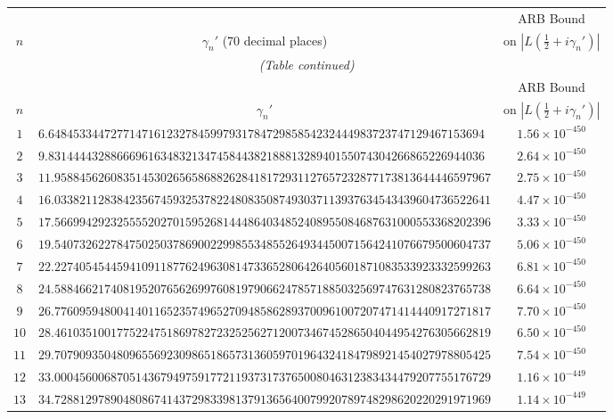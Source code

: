 \documentclass[12pt,reqno]{amsart}
\theoremstyle{remark}
\begin{document}
\renewcommand{\arraystretch}{1.1}
\setlength{\LTleft}{\fill}
\setlength{\LTright}{\fill}
\footnotesize
\begin{longtable}{clc}
\toprule
 & & ARB Bound \\
$n$ & \multicolumn{1}{c}{$\gamma_n'$ (70 decimal places)} & on $|L(\tfrac{1}{2}+i\gamma_n')|$ \\
\midrule
\endfirsthead
\multicolumn{3}{c}{\small\itshape (Table continued)} \\
\toprule
 & & ARB Bound \\
$n$ & \multicolumn{1}{c}{$\gamma_n'$} & on $|L(\tfrac{1}{2}+i\gamma_n')|$ \\
\midrule
\endhead
\bottomrule
\endlastfoot
$1$ & $6.6484533447277147161232784599793178472985854232444983723747129467153694$ & $1.56\times 10^{-450}$ \\
$2$ & $9.8314444328866696163483213474584438218881328940155074304266865226944036$ & $2.64\times 10^{-450}$ \\
$3$ & $11.9588456260835145302656586882628418172931127657232877173813644446597967$ & $2.75\times 10^{-450}$ \\
$4$ & $16.0338211283842356745932537822480835087493037113937634543439604736522641$ & $4.47\times 10^{-450}$ \\
$5$ & $17.5669942923255552027015952681444864034852408955084687631000553368202396$ & $3.33\times 10^{-450}$ \\
$6$ & $19.5407326227847502503786900229985534855264934450071564241076679500604737$ & $5.06\times 10^{-450}$ \\
$7$ & $22.2274054544594109118776249630814733652806426405601871083533923332599263$ & $6.81\times 10^{-450}$ \\
$8$ & $24.5884662174081952076562699760819790662478571885032569747631280823765738$ & $6.64\times 10^{-450}$ \\
$9$ & $26.7760959480041401165235749652709485862893700961007207471414440917271817$ & $7.70\times 10^{-450}$ \\
$10$ & $28.4610351001775224751869782723252562712007346745286504044954276305662819$ & $6.50\times 10^{-450}$ \\
$11$ & $29.7079093504809655692309865186573136059701964324184798921454027978805425$ & $7.54\times 10^{-450}$ \\
$12$ & $33.0004560068705143679497591772119373173765008046312383434479207755176729$ & $1.16\times 10^{-449}$ \\
$13$ & $34.7288129789048086741437298339813791365640079920789748298620220291971969$ & $1.14\times 10^{-449}$ \\

\end{longtable}
\end{document}
